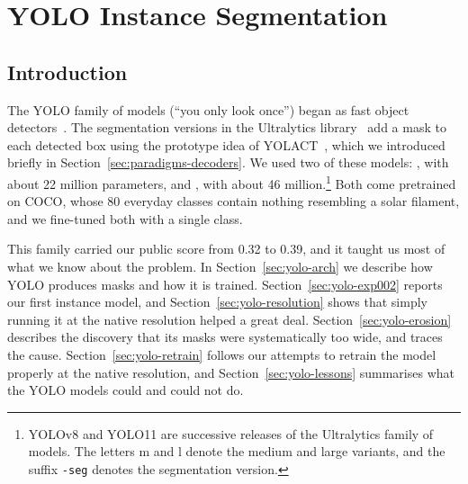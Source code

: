\chapter{YOLO Instance Segmentation}\label{ch:yolo}

\section{Introduction}\label{sec:yolo-intro}
The YOLO family of models (``you only look once'') began as fast object detectors~\citep{yolo}. The
segmentation versions in the Ultralytics library~\citep{ultralytics} add a mask to each detected box
using the prototype idea of YOLACT~\citep{yolact}, which we introduced briefly in
Section~\ref{sec:paradigms-decoders}. We used two of these models: , with about
22 million parameters, and , with about 46 million.\footnote{YOLOv8 and
YOLO11 are successive releases of the Ultralytics family of models. The letters m and l denote the
medium and large variants, and the suffix \texttt{-seg} denotes the segmentation version.} Both come pretrained on
COCO, whose 80 everyday classes contain nothing resembling a solar filament, and we fine-tuned both
with a single class.

This family carried our public score from 0.32 to 0.39, and it taught us most of what we know about
the problem. In Section~\ref{sec:yolo-arch} we describe how YOLO produces masks and how it is
trained. Section~\ref{sec:yolo-exp002} reports our first instance model, and
Section~\ref{sec:yolo-resolution} shows that simply running it at the native resolution helped a
great deal. Section~\ref{sec:yolo-erosion} describes the discovery that its masks were
systematically too wide, and traces the cause. Section~\ref{sec:yolo-retrain} follows our attempts
to retrain the model properly at the native resolution, and Section~\ref{sec:yolo-lessons}
summarises what the YOLO models could and could not do.

